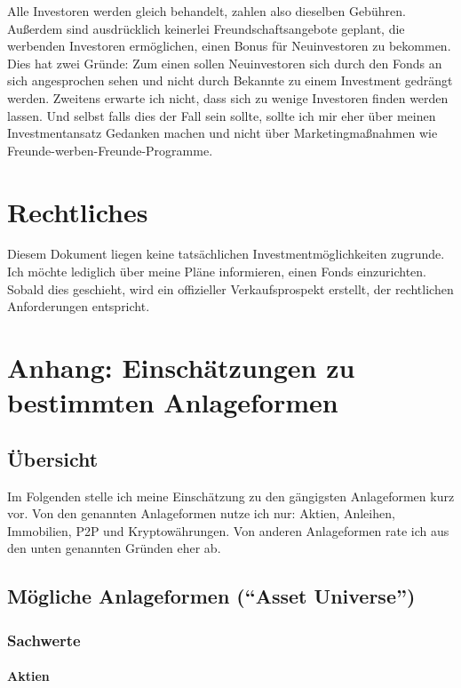\documentclass{article}
\begin{document}
Alle Investoren werden gleich behandelt, zahlen also dieselben Gebühren. Außerdem sind ausdrücklich keinerlei Freundschaftsangebote geplant, die werbenden Investoren ermöglichen, einen Bonus für Neuinvestoren zu bekommen. Dies hat zwei Gründe: Zum einen sollen Neuinvestoren sich durch den Fonds an sich angesprochen sehen und nicht durch Bekannte zu einem Investment gedrängt werden. Zweitens erwarte ich nicht, dass sich zu wenige Investoren finden werden lassen. Und selbst falls dies der Fall sein sollte, sollte ich mir eher über meinen Investmentansatz Gedanken machen und nicht über Marketingmaßnahmen wie Freunde-werben-Freunde-Programme. 
\section{Rechtliches}

Diesem Dokument liegen keine tatsächlichen Investmentmöglichkeiten zugrunde. Ich möchte lediglich über meine Pläne informieren, einen Fonds einzurichten. Sobald dies geschieht, wird ein offizieller Verkaufsprospekt erstellt, der rechtlichen Anforderungen entspricht.

\section{Anhang: Einschätzungen zu bestimmten Anlageformen}

\subsection{Übersicht}

Im Folgenden stelle ich meine Einschätzung zu den gängigsten Anlageformen kurz vor. Von den genannten Anlageformen nutze ich nur: Aktien, Anleihen, Immobilien, P2P und Kryptowährungen. Von anderen Anlageformen rate ich aus den unten genannten Gründen eher ab.

\subsection{Mögliche Anlageformen (``Asset Universe'')}

\subsubsection{Sachwerte}

\paragraph{Aktien}
\end{document}

